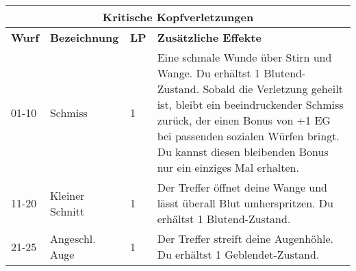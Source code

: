 \documentclass[a4paper, fontsize=8.5pt]{scrartcl}
\begin{document}

\begin{table}[!ht]
    \centering
    \begin{tabularx}{\textwidth}{lp{2.5cm}lX}
        \multicolumn{4}{c}{\cellcolor{gray!25} \textbf{Kritische Kopfverletzungen}}                                                                                                                                                                                                                                                                                                                                                                                                                           \\ \hline
        \textbf{Wurf} & \textbf{Bezeichnung}    & \textbf{LP} & \textbf{Zusätzliche Effekte}                                                                                                                                                                                                                                                                                                                                                                                                                  \\ \hline
        01-10         & Schmiss                 & 1           & Eine schmale Wunde über Stirn und Wange. Du erhältst 1 Blutend-Zustand. Sobald die Verletzung geheilt ist, bleibt ein beeindruckender Schmiss zurück, der einen Bonus von +1 EG bei passenden sozialen Würfen bringt. Du kannst diesen bleibenden Bonus nur ein einziges Mal erhalten.                                                                                                                                                        \\ \hline
        11-20         & Kleiner Schnitt         & 1           & Der Treffer öffnet deine Wange und lässt überall Blut umherspritzen. Du erhältst 1 Blutend-Zustand.                                                                                                                                                                                                                                                                                                                                           \\ \hline
        21-25         & Angeschl. Auge          & 1           & Der Treffer streift deine Augenhöhle. Du erhältst 1 Geblendet-Zustand.                                                                                                                                                                                                                                                                                                                                                                        \\ \hline

\end{tabularx}
\end{table}
\end{document}
